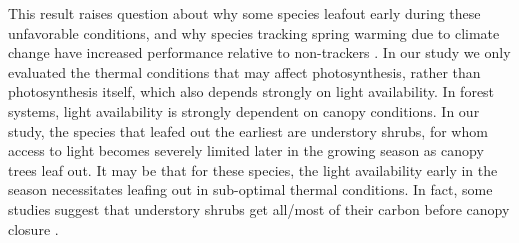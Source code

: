 \documentclass{article}[12pt]
\begin{document}
This result raises question about why some species leafout early during these unfavorable conditions, and why species tracking spring warming due to climate change have increased performance relative to non-trackers \citep{Cleland2012}. In our study we only evaluated the thermal conditions that may affect photosynthesis, rather than photosynthesis itself, which also depends strongly on light availability. In forest systems, light availability is strongly dependent on canopy conditions. In our study, the species that leafed out the earliest are understory shrubs, for whom access to light becomes severely limited later in the growing season as canopy trees leaf out. It may be that for these species, the light availability early in the season necessitates leafing out in sub-optimal thermal conditions. In fact, some studies suggest that understory shrubs get all/most of their carbon before canopy closure \citep{AUGSPURGER2005}.
\end{document}
